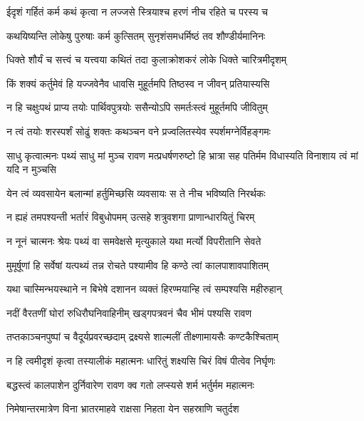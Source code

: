\twolineshloka
{ईदृशं गर्हितं कर्म कथं कृत्वा न लज्जसे}
{स्त्रियाश्च हरणं नीच रहिते च परस्य च} %

\twolineshloka
{कथयिष्यन्ति लोकेषु पुरुषाः कर्म कुत्सितम्}
{सुनृशंसमधर्मिष्ठं तव शौण्डीर्यमानिनः} %

\twolineshloka
{धिक्ते शौर्यं च सत्त्वं च यत्त्वया कथितं तदा}
{कुलाक्रोशकरं लोके धिक्ते चारित्रमीदृशम्} %

\twolineshloka
{किं शक्यं कर्तुमेवं हि यज्जवेनैव धावसि}
{मुहूर्तमपि तिष्ठस्व न जीवन् प्रतियास्यसि} %

\twolineshloka
{न हि चक्षुःपथं प्राप्य तयोः पार्थिवपुत्रयोः}
{ससैन्योऽपि समर्तःस्त्वं मुहूर्तमपि जीवितुम्} %

\twolineshloka
{न त्वं तयोः शरस्पर्शं सोढुं शक्तः कथञ्चन}
{वने प्रज्वलितस्येव स्पर्शमग्नेर्विहङ्गमः} %

\threelineshloka
{साधु कृत्वात्मनः पथ्यं साधु मां मुञ्च रावण}
{मत्प्रधर्षणरुष्टो हि भ्रात्रा सह पतिर्मम}
{विधास्यति विनाशाय त्वं मां यदि न मुञ्चसि} %

\twolineshloka
{येन त्वं व्यवसायेन बलान्मां हर्तुमिच्छसि}
{व्यवसायः स ते नीच भविष्यति निरर्थकः} %

\twolineshloka
{न ह्यहं तमपश्यन्ती भर्तारं विबुधोपमम्}
{उत्सहे शत्रुवशगा प्राणान्धारयितुं चिरम्} %

\twolineshloka
{न नूनं चात्मनः श्रेयः पथ्यं वा समवेक्षसे}
{मृत्युकाले यथा मर्त्यो विपरीतानि सेवते} %

\twolineshloka
{मुमूर्षूणां हि सर्वेषां यत्पथ्यं तन्न रोचते}
{पश्यामीव हि कण्ठे त्वां कालपाशावपाशितम्} %

\twolineshloka
{यथा चास्मिन्भयस्थाने न बिभेषे दशानन}
{व्यक्तं हिरण्मयान्हि त्वं सम्पश्यसि महीरुहान्} %

\twolineshloka
{नदीं वैरतणीं घोरां रुधिरौघनिवाहिनीम्}
{खड्गपत्रवनं चैव भीमं पश्यसि रावण} %

\twolineshloka
{तप्तकाञ्चनपुष्पां च वैदूर्यप्रवरच्छदाम्}
{द्रक्ष्यसे शाल्मलीं तीक्ष्णामायसैः कण्टकैश्चिताम्} %

\twolineshloka
{न हि त्वमीदृशं कृत्वा तस्यालीकं महात्मनः}
{धारितुं शक्ष्यसि चिरं विषं पीत्वेव निर्घृणः} %

\twolineshloka
{बद्धस्त्वं कालपाशेन दुर्निवारेण रावण}
{क्व गतो लप्स्यसे शर्म भर्तुर्मम महात्मनः} %

\twolineshloka
{निमेषान्तरमात्रेण विना भ्रातरमाहवे}
{राक्षसा निहता येन सहस्राणि चतुर्दश} %

